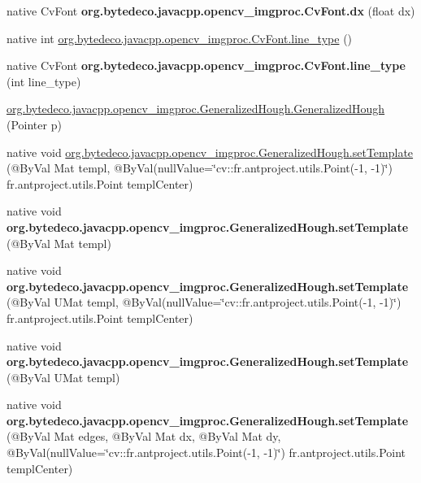\begin{DoxyCompactItemize}
native Cv\+Font {\bfseries org.\+bytedeco.\+javacpp.\+opencv\+\_\+imgproc.\+Cv\+Font.\+dx} (float dx)
\item 
native int \hyperlink{group__imgproc_gaa10a37186c21769dac36657ca65b282c}{org.\+bytedeco.\+javacpp.\+opencv\+\_\+imgproc.\+Cv\+Font.\+line\+\_\+type} ()
\item 
\mbox{\label{group__imgproc_ga5bd93072f0d7d13a447575e68e2a5b0e}} 
native Cv\+Font {\bfseries org.\+bytedeco.\+javacpp.\+opencv\+\_\+imgproc.\+Cv\+Font.\+line\+\_\+type} (int line\+\_\+type)
\item 
\hyperlink{group__imgproc_ga132d7d11159b6bc9833bb4597ee499d2}{org.\+bytedeco.\+javacpp.\+opencv\+\_\+imgproc.\+Generalized\+Hough.\+Generalized\+Hough} (Pointer p)
\item 
native void \hyperlink{group__imgproc_ga16cb031da52c3fe55c8196bca11a72f3}{org.\+bytedeco.\+javacpp.\+opencv\+\_\+imgproc.\+Generalized\+Hough.\+set\+Template} (@By\+Val Mat templ, @By\+Val(null\+Value=\char`\"{}cv\+::\+fr.antproject.utils.Point(-\/1, -\/1)\char`\"{}) fr.antproject.utils.Point templ\+Center)
\item 
\mbox{\label{group__imgproc_gab308a162f7c55f2d1f356f07f01a5edd}} 
native void {\bfseries org.\+bytedeco.\+javacpp.\+opencv\+\_\+imgproc.\+Generalized\+Hough.\+set\+Template} (@By\+Val Mat templ)
\item 
\mbox{\label{group__imgproc_ga2d7f24941ef6d19ac9fb262921b8beeb}} 
native void {\bfseries org.\+bytedeco.\+javacpp.\+opencv\+\_\+imgproc.\+Generalized\+Hough.\+set\+Template} (@By\+Val U\+Mat templ, @By\+Val(null\+Value=\char`\"{}cv\+::\+fr.antproject.utils.Point(-\/1, -\/1)\char`\"{}) fr.antproject.utils.Point templ\+Center)
\item 
\mbox{\label{group__imgproc_gae806815421360d76961d4e861e9d0361}} 
native void {\bfseries org.\+bytedeco.\+javacpp.\+opencv\+\_\+imgproc.\+Generalized\+Hough.\+set\+Template} (@By\+Val U\+Mat templ)
\item 
\mbox{\label{group__imgproc_ga60ec03951009de9dac03edf6bdd7d2ff}} 
native void {\bfseries org.\+bytedeco.\+javacpp.\+opencv\+\_\+imgproc.\+Generalized\+Hough.\+set\+Template} (@By\+Val Mat edges, @By\+Val Mat dx, @By\+Val Mat dy, @By\+Val(null\+Value=\char`\"{}cv\+::\+fr.antproject.utils.Point(-\/1, -\/1)\char`\"{}) fr.antproject.utils.Point templ\+Center)

\end{DoxyCompactItemize}
